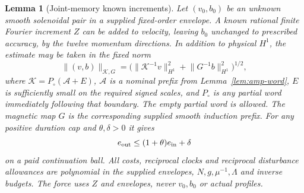 \documentclass[11pt,a4paper]{amsart}
\newtheorem{lemma}[theorem]{Lemma}
\theoremstyle{definition}
\theoremstyle{remark}
\numberwithin{equation}{section}
\newcommand{\norm}[1]{\lVert #1\rVert}
\begin{document}
\begin{lemma}[Joint-memory known increments]\label{lem:amp-increment}
Let $(v_0,b_0)$ be an unknown smooth solenoidal pair in a supplied
fixed-order envelope.  A known rational finite Fourier increment $Z$
can be added to velocity, leaving $b_0$ unchanged to prescribed accuracy,
by the twelve momentum directions.  In addition to physical $H^1$,
the estimate may be taken in the fixed norm
\begin{equation}\label{eq:amp-fixed-metric}
 \norm{(v,b)}_{\mathcal K,G}
   =\bigl(\norm{\mathcal K^{-1}v}_{H^1}^2+
                    \norm{G^{-1}b}_{H^1}^2\bigr)^{1/2},
\end{equation}
where $\mathcal K=P_\circ(\mathcal A+E)$, $\mathcal A$ is a nominal prefix
from Lemma~\ref{lem:amp-word}, $E$ is sufficiently small on the required
signed scales, and $P_\circ$ is any partial word immediately following
that boundary. The empty partial word is allowed. The magnetic map $G$
is the corresponding supplied smooth induction prefix.
For any positive duration cap and $\theta,\delta>0$ it gives
\begin{equation}\label{eq:amp-increment}
 e_{\rm out}\le(1+\theta)e_{\rm in}+\delta
\end{equation}
on a paid continuation ball.  All costs, reciprocal clocks and
reciprocal disturbance allowances are polynomial in the supplied
envelopes, $N,g,\mu^{-1},\Lambda$ and inverse budgets.
The force uses $Z$ and envelopes, never $v_0,b_0$ or actual profiles.
\end{lemma}
\end{document}
